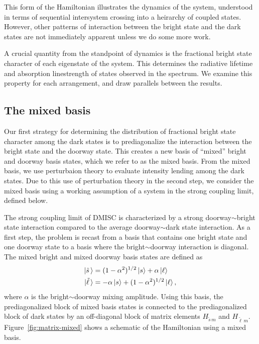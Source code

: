 \documentclass[12pt]{mitthesis}
\newcommand{\ts}{\tilde{s}\,}
\newcommand{\tl}{\tilde{\ell}\,}
\begin{document}
This form of the Hamiltonian illustrates the dynamics of the system,
understood in terms of sequential intersystem crossing into a
heirarchy of coupled states. However, other patterns of interaction
between the bright state and the dark states are not immediately
apparent unless we do some more work.

A crucial quantity from the standpoint of dynamics is the fractional
bright state character of each eigenstate of the system. This
determines the radiative lifetime and absorption linestrength of
states observed in the spectrum. We examine this property for each
arrangement, and draw parallels between the results.

\subsection{The mixed basis}
\label{sec:mixed-basis}

Our first strategy for determining the distribution of fractional
bright state character among the dark states is to prediagonalize the
interaction between the bright state and the doorway state.  This
creates a new basis of ``mixed'' bright and doorway basis states,
which we refer to as the mixed basis.  From the mixed basis, we use
perturbaion theory to evaluate intensity lending among the dark
states.  
Due to this use of perturbation theory in the second step, we consider
the mixed basis using a working assumption of a system in the strong
coupling limit, defined below.

The strong coupling limit of DMISC is characterized by a strong
doorway$\sim$bright state interaction compared to the average
doorway$\sim$dark state interaction. As a first step, the problem is
recast from a basis that contains one bright state and one doorway
state to a basis where the bright$\sim$doorway interaction is
diagonal.  The mixed bright and mixed doorway basis states are defined
as
\begin{equation}
  \label{eq:mixed-basis-def}
  \begin{split}
    \ket{\ts} & = (1-\alpha^2)^{1/2} \ket{s} + \alpha \ket{\ell} \\
    \ket{\tl} & = - \alpha \ket{s} + (1-\alpha^2)^{1/2} \ket{\ell},
  \end{split}
\end{equation}
where $\alpha$ is the bright$\sim$doorway mixing amplitude. Using this
basis, the prediagonalized block of mixed basis states is connected to
the prediagonalized block of dark states by an off-diagonal block of
matrix elements $H_{\ts m}$ and $H_{\tl
  m}$. Figure~\ref{fig:matrix-mixed} shows a schematic of the
Hamiltonian using a mixed basis.
\end{document}

